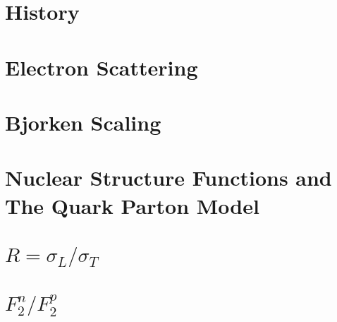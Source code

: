 
\section{History}


\section{Electron Scattering}


\section{Bjorken Scaling}


\section{Nuclear Structure Functions and The Quark Parton Model}


\section{$R=\sigma_L/\sigma_T$}


\section{$F_2^n/F_2^p$}


%


